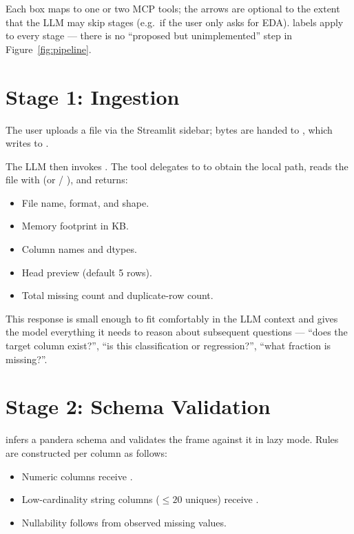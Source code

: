 Each box maps to one or two MCP tools; the arrows are optional to the
extent that the LLM may skip stages (e.g.\ if the user only asks for
EDA). \impl{} labels apply to every stage --- there is no ``proposed
but unimplemented'' step in Figure~\ref{fig:pipeline}.

\section{Stage 1: Ingestion}
\label{sec:stage-ingest}

The user uploads a file via the Streamlit sidebar; bytes are handed
to , which writes to
.

The LLM then invokes . The tool
delegates to  to obtain the local
path, reads the file with 
(or  / ), and returns:

\begin{itemize}[leftmargin=1.4em]
  \item File name, format, and shape.
  \item Memory footprint in KB.
  \item Column names and dtypes.
  \item Head preview (default 5 rows).
  \item Total missing count and duplicate-row count.
\end{itemize}

This response is small enough to fit comfortably in the LLM context
and gives the model everything it needs to reason about subsequent
questions --- ``does the target column exist?'', ``is this
classification or regression?'', ``what fraction is missing?''.

\section{Stage 2: Schema Validation}
\label{sec:stage-validate}

 infers a pandera schema and validates the frame
against it in lazy mode. Rules are constructed per column as follows:

\begin{itemize}[leftmargin=1.4em]
  \item Numeric columns receive
        .
  \item Low-cardinality string columns ($\le 20$ uniques) receive
        .
  \item Nullability follows from observed missing values.
\end{itemize}

